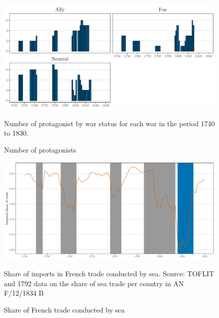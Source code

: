 \documentclass[12pt,a4paper,notitlepage,english]{article}
\newcommand{\fontsmall}{\fontsize{10pt}{12pt}\selectfont}
\begin{document}
\pagebreak

\renewcommand{\baselinestretch}{1.0}\normalsize




\clearpage


\begin{appendix}




\begin{center}
\begin{figure}[h!]
\caption{Number of protagonists}
\label{fig:number_of_protagonist}
\centering
\includegraphics[scale=.18]{Number_of_protagonist}
\begin{minipage}{.9\textwidth}
\begin{flushleft}
\fontsmall
Number of protagonist by war status for each war in the period 1740 to 1830.
\end{flushleft}
\end{minipage}
\end{figure}
\end{center}



\begin{figure}[h!]
\caption{Share of French trade conducted by sea}\label{share_by_sea}
\centering
\includegraphics[scale=.19]{share_by_sea}
\begin{minipage}{18cm}
\begin{flushleft}
\fontsmall
Share of imports in French trade conducted by sea. 
Source: TOFLIT and 1792 data on the share of sea trade per country in AN F/12/1834 B
\end{flushleft}
\end{minipage}
\end{figure}



\end{appendix}
\end{document}
